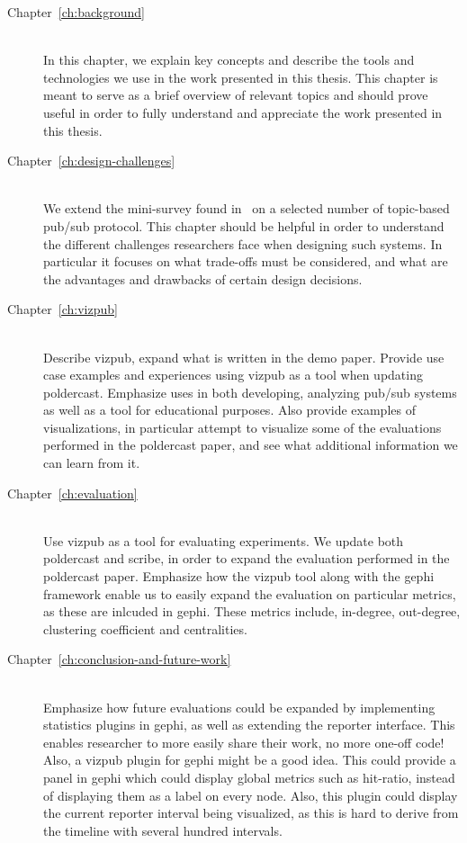 \begin{description}
    \item[Chapter~\ref{ch:background}] \hfill \\

        In this chapter, we explain key concepts and describe the tools
        and technologies we use in the work presented in this thesis.
        This chapter is meant to serve as a brief overview of relevant
        topics and should prove useful in order to fully understand and
        appreciate the work presented in this thesis.

    \item[Chapter~\ref{ch:design-challenges}] \hfill \\

        We extend the mini-survey found in~\cite{Setty:2012} on a
        selected number of topic-based pub/sub protocol. This chapter
        should be helpful in order to understand the different
        challenges researchers face when designing such systems. In
        particular it focuses on what trade-offs must be considered, and
        what are the advantages and drawbacks of certain design
        decisions.

    \item[Chapter~\ref{ch:vizpub}] \hfill \\
        Describe vizpub, expand what is written in the demo paper.
        Provide use case examples and experiences using vizpub as a tool
        when updating poldercast. Emphasize uses in both developing,
        analyzing pub/sub systems as well as a tool for educational
        purposes. Also provide examples of visualizations, in particular
        attempt to visualize some of the evaluations performed in the
        poldercast paper, and see what additional information we can
        learn from it.
    \item[Chapter~\ref{ch:evaluation}] \hfill \\
        Use vizpub as a tool for evaluating experiments. We update both
        poldercast and scribe, in order to expand the evaluation
        performed in the poldercast paper. Emphasize how the vizpub tool
        along with the gephi framework enable us to easily expand the
        evaluation on particular metrics, as these are inlcuded in
        gephi. These metrics include, in-degree, out-degree, clustering
        coefficient and centralities.
    \item[Chapter~\ref{ch:conclusion-and-future-work}] \hfill \\
        Emphasize how future evaluations could be expanded by
        implementing statistics plugins in gephi, as well as extending
        the reporter interface. This enables researcher to more easily
        share their work, no more one-off code! Also, a vizpub plugin
        for gephi might be a good idea. This could provide a panel in
        gephi which could display global metrics such as hit-ratio,
        instead of displaying them as a label on every node. Also, this
        plugin could display the current reporter interval being
        visualized, as this is hard to derive from the timeline with
        several hundred intervals.
\end{description}
